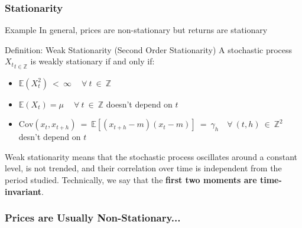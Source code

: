 \documentclass{beamer}
\begin{document}
\begin{frame}
  \frametitle{Stationarity}
  \begin{exampleblock}{Example}
   In general, prices are non-stationary but returns are stationary 
 \end{exampleblock}

 \begin{block}{Definition: Weak Stationarity (Second Order Stationarity)}
   A stochastic process ${X_t}_{t \in \mathbb{Z}}$ is weakly stationary if and only if:

   \begin{itemize}
   \item $\mathbb{E}(X^2_t) \ < \ \infty \ \quad \forall \ t \ \in \ \mathbb{Z}$
   \item $\mathbb{E}(X_t) = \mu \ \quad \forall \ t \ \in \ \mathbb{Z}$ doesn't depend on $t$
   \item $\text{Cov}(x_t, x_{t+h}) \ = \ \mathbb{E}[(x_{t+h} - m)(x_t - m)] \ = \ \gamma_h \quad \forall \ (t, h) \ \in \ \mathbb{Z}^2$ desn't depend on $t$
   \end{itemize}

   Weak stationarity means that the stochastic process oscillates around a constant level, is not trended, and their correlation over time is independent from the period studied. Technically, we say that the \textbf{first two moments are time-invariant}.\\
   
 \end{block}
 
\end{frame}


\begin{frame}
\frametitle{Prices are Usually Non-Stationary...}
\end{frame}
\end{document}
